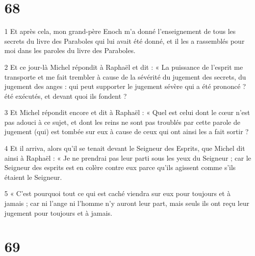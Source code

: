 \chapter{68}

\par 1 Et après cela, mon grand-père Enoch m'a donné l'enseignement de tous les secrets du livre des Paraboles qui lui avait été donné, et il les a rassemblés pour moi dans les paroles du livre des Paraboles.
\par 2 Et ce jour-là Michel répondit à Raphaël et dit : « La puissance de l'esprit me transporte et me fait trembler à cause de la sévérité du jugement des secrets, du jugement des anges : qui peut supporter le jugement sévère qui a été prononcé ? été exécutés, et devant quoi ils fondent ?
\par 3 Et Michel répondit encore et dit à Raphaël : « Quel est celui dont le cœur n'est pas adouci à ce sujet, et dont les reins ne sont pas troublés par cette parole de jugement (qui) est tombée sur eux à cause de ceux qui ont ainsi les a fait sortir ?
\par 4 Et il arriva, alors qu'il se tenait devant le Seigneur des Esprits, que Michel dit ainsi à Raphaël : « Je ne prendrai pas leur parti sous les yeux du Seigneur ; car le Seigneur des esprits est en colère contre eux parce qu'ils agissent comme s'ils étaient le Seigneur.
\par 5 « C'est pourquoi tout ce qui est caché viendra sur eux pour toujours et à jamais ; car ni l'ange ni l'homme n'y auront leur part, mais seuls ils ont reçu leur jugement pour toujours et à jamais.

\chapter{69}

